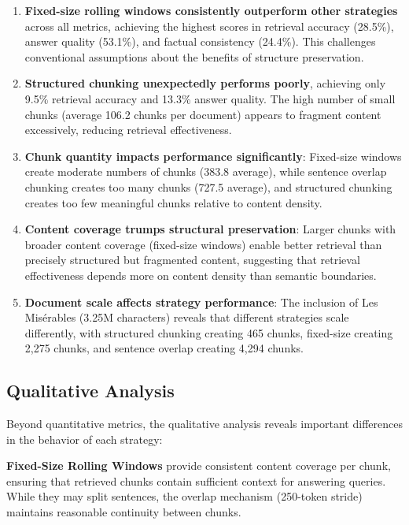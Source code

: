 \documentclass[11pt,a4paper]{article}
\begin{document}
\begin{enumerate}
\item \textbf{Fixed-size rolling windows consistently outperform other strategies} across all metrics, achieving the highest scores in retrieval accuracy (28.5\%), answer quality (53.1\%), and factual consistency (24.4\%). This challenges conventional assumptions about the benefits of structure preservation.

\item \textbf{Structured chunking unexpectedly performs poorly}, achieving only 9.5\% retrieval accuracy and 13.3\% answer quality. The high number of small chunks (average 106.2 chunks per document) appears to fragment content excessively, reducing retrieval effectiveness.

\item \textbf{Chunk quantity impacts performance significantly}: Fixed-size windows create moderate numbers of chunks (383.8 average), while sentence overlap chunking creates too many chunks (727.5 average), and structured chunking creates too few meaningful chunks relative to content density.

\item \textbf{Content coverage trumps structural preservation}: Larger chunks with broader content coverage (fixed-size windows) enable better retrieval than precisely structured but fragmented content, suggesting that retrieval effectiveness depends more on content density than semantic boundaries.

\item \textbf{Document scale affects strategy performance}: The inclusion of Les Misérables (3.25M characters) reveals that different strategies scale differently, with structured chunking creating 465 chunks, fixed-size creating 2,275 chunks, and sentence overlap creating 4,294 chunks.
\end{enumerate}

\subsection{Qualitative Analysis}

Beyond quantitative metrics, the qualitative analysis reveals important differences in the behavior of each strategy:

\textbf{Fixed-Size Rolling Windows} provide consistent content coverage per chunk, ensuring that retrieved chunks contain sufficient context for answering queries. While they may split sentences, the overlap mechanism (250-token stride) maintains reasonable continuity between chunks.
\end{document}
